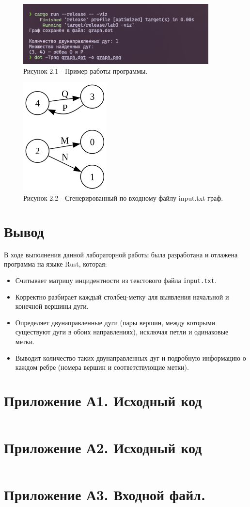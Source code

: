 \documentclass[oneside,a4paper,14pt]{extarticle}
\begin{document}
\clearpage
\begin{figure}[H]
	\centering
	\includegraphics[width=0.9\textwidth]{pics/screen.png}
	\caption*{Рисунок 2.1 - Пример работы программы.}
\end{figure}

\begin{figure}[H]
	\centering
	\includegraphics[height=0.5\textheight]{pics/graph.png}
	\caption*{Рисунок 2.2 - Сгенерированный по входному файлу input.txt граф.}
\end{figure}

\section*{Вывод}


В ходе выполнения данной лабораторной работы была разработана и отлажена программа на языке Rust, которая:
\begin{itemize}
    \item Считывает матрицу инцидентности из текстового файла \texttt{input.txt}.
    \item Корректно разбирает каждый столбец-метку для выявления начальной и конечной вершины дуги.
    \item Определяет двунаправленные дуги (пары вершин, между которыми существуют дуги в обоих направлениях), исключая петли и одинаковые метки.
    \item Выводит количество таких двунаправленных дуг и подробную информацию о каждом ребре (номера вершин и соответствующие метки).
\end{itemize}

\newpage
\section*{Приложение А1. Исходный код}
\inputminted{rust}{src/main.rs}

\newpage
\section*{Приложение А2. Исходный код}
\inputminted{rust}{src/graphviz.rs}

\newpage
\section*{Приложение А3. Входной файл.}
\inputminted{text}{./input.txt}
\end{document}
